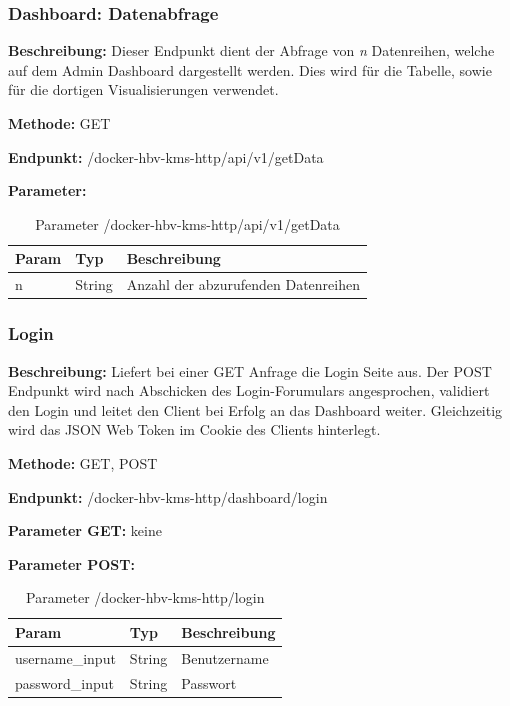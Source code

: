 \subsubsection{Dashboard: Datenabfrage}
\label{sec:routes-dashboard-query}
\textbf{Beschreibung:} Dieser Endpunkt dient der Abfrage von \textit{n} Datenreihen, welche auf dem Admin Dashboard dargestellt werden. Dies wird für die Tabelle, sowie für die dortigen Visualisierungen verwendet.

\textbf{Methode:} GET

\textbf{Endpunkt:} /docker-hbv-kms-http/api/v1/getData

\textbf{Parameter:}
\begin{table}[H]
    \label{table:/docker-hbv-kms-http/api/v1/getData}
    \caption{Parameter /docker-hbv-kms-http/api/v1/getData}
    \setlength{\tabcolsep}{3pt}
    \begin{tabular}{p{100pt}p{80pt}p{200pt}}
        \toprule
        Param & Typ    & Beschreibung                        \\
        \midrule
        n     & String & Anzahl der abzurufenden Datenreihen \\
        \bottomrule
    \end{tabular}
\end{table}
\dotfill

\subsubsection{Login}
\label{sec:routes-login}
\textbf{Beschreibung:} Liefert bei einer GET Anfrage die Login Seite aus. Der POST Endpunkt wird nach Abschicken des Login-Forumulars angesprochen, validiert den Login und leitet den Client bei Erfolg an das Dashboard weiter. Gleichzeitig wird das JSON Web Token im Cookie des Clients hinterlegt.

\textbf{Methode:} GET, POST

\textbf{Endpunkt:} /docker-hbv-kms-http/dashboard/login

\textbf{Parameter GET:} keine

\textbf{Parameter POST:}
\begin{table}[H]
    \label{table:/docker-hbv-kms-http/login}
    \caption{Parameter /docker-hbv-kms-http/login}
    \setlength{\tabcolsep}{3pt}
    \begin{tabular}{p{100pt}p{80pt}p{200pt}}
        \toprule
        Param           & Typ    & Beschreibung \\
        \midrule
        username\_input & String & Benutzername \\
        password\_input & String & Passwort     \\
        \bottomrule
    \end{tabular}
\end{table}
\dotfill

